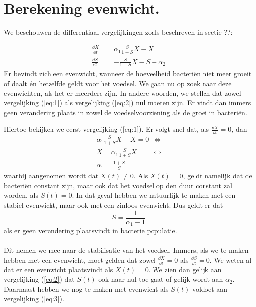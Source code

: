 

\section{Berekening evenwicht.}
We beschouwen de differentiaal vergelijkingen zoals beschreven in sectie ??: %

\begin{align}
	\tfrac{\dd X}{\dd t} &= \alpha_1 \frac{S}{1 + S} X - X 			\label{eq:1}	\\
	\tfrac{\dd S}{\dd t} &= - \frac{S}{1 + S}X - S + \alpha_2 		\label{eq:2}
\end{align}
Er bevindt zich een evenwicht, wanneer de hoeveelheid bacteri\"en niet meer groeit of daalt \'en hetzelfde geldt voor het voedsel. We gaan nu op zoek naar deze evenwichten, als het er meerdere zijn. In andere woorden, we stellen dat zowel vergelijking (\ref{eq:1}) als vergelijking (\ref{eq:2}) nul moeten zijn. Er vindt dan immers geen verandering plaats in zowel de voedselvoorziening als de groei in bacteri\"en. 

Hiertoe bekijken we eerst vergelijking (\ref{eq:1}). Er volgt snel dat, als $\tfrac{\dd X}{\dd t} = 0$, dan
\begin{align*}
	\alpha_1 \frac{S}{1 + S} X - X = 0 &\iff \\
	X = \alpha_1 \frac{S}{1 + S}X &\iff \\
	\alpha_1 = \frac{1 + S}{S}
\end{align*}
waarbij aangenomen wordt dat $X(t) \not = 0$. Als $X(t) = 0$, geldt namelijk dat de bacteri\"en constant zijn, maar ook dat het voedsel op den duur constant zal worden, als $S(t) = 0$. In dat geval hebben we natuurlijk te maken met een stabiel evenwicht, maar ook met een zinloos evenwicht. Dus geldt er dat
\begin{equation}
	S = \frac{1}{\alpha_1 - 1}					\label{eq:3}
\end{equation}
als er geen verandering plaatsvindt in bacterie populatie. 
\\
\\
Dit nemen we mee naar de stabilisatie van het voedsel. Immers, als we te maken hebben met een evenwicht, moet gelden dat zowel $\tfrac{\dd X}{\dd t} = 0$ als $\tfrac{\dd S}{ \dd t } = 0$. We weten al dat er een evenwicht plaatsvindt als $X(t) = 0$. We zien dan gelijk aan vergelijking (\ref{eq:2}) dat $S(t)$ ook naar nul toe gaat of gelijk wordt aan $\alpha_2$. Daarnaast hebben we nog te maken met evenwicht als $S(t)$ voldoet aan vergelijking (\ref{eq:3}). 

